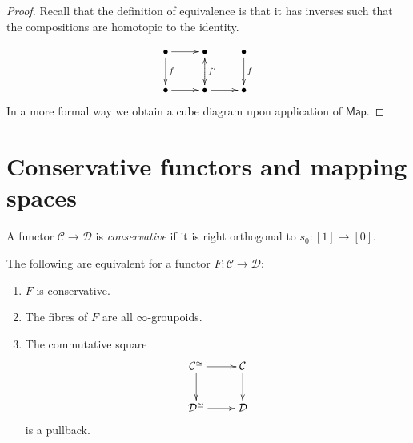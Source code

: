 \begin{proof}
Recall that the definition of
equivalence is that it has inverses such
that the compositions are homotopic to the identity.

$$
\xymatrix{
\bullet\ar[r]\ar[d]^f&\bullet\ar[d]^{f'}&\bullet\ar[d]^{f}\\
\bullet\ar[r]&\bullet\ar@{.>}[u]\ar[r]&\bullet
}
$$
In a more formal way we obtain a cube diagram
upon application of $\mathsf{Map}$.
\end{proof}

\section{Conservative functors and mapping spaces}
\label{section-conservative-functors-and-mapping-spaces}

\begin{definition}
\label{definition-conservative-functor}
A functor $\mathcal{C} \to \mathcal{D}$ is {\it conservative} 
if it is right orthogonal to $s_0:[1]\to [0]$.
\end{definition}

\begin{exercise}
\label{exercise-equivalences-for-conservative-functor}
The following are equivalent for a functor $F:\mathcal{C} \to \mathcal{D}$:
\begin{enumerate}
\item $F$ is conservative.
\label{item-conservative1}

\item The fibres of $F$ are all $\infty$-groupoids.
\label{item-conservative2}

\item The commutative square
\label{item-conservative3}
$$
\xymatrix{
\mathcal{C}^{\simeq}\ar[r]\ar[d]&\mathcal{C}\ar[d]\\
\mathcal{D}^{\simeq}\ar[r]&\mathcal{D}
}
$$
is a pullback.
\end{enumerate}
\end{exercise}


